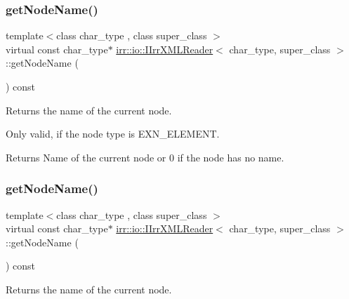 \subsubsection{\texorpdfstring{get\+Node\+Name()}{getNodeName()}\hspace{0.1cm}{\footnotesize\ttfamily [1/2]}}
{\footnotesize\ttfamily template$<$class char\+\_\+type , class super\+\_\+class $>$ \\
virtual const char\+\_\+type$\ast$ \hyperlink{classirr_1_1io_1_1IIrrXMLReader}{irr\+::io\+::\+I\+Irr\+X\+M\+L\+Reader}$<$ char\+\_\+type, super\+\_\+class $>$\+::get\+Node\+Name (\begin{DoxyParamCaption}{ }\end{DoxyParamCaption}) const\hspace{0.3cm}{\ttfamily [pure virtual]}}



Returns the name of the current node. 

Only valid, if the node type is E\+X\+N\+\_\+\+E\+L\+E\+M\+E\+NT. \begin{DoxyReturn}{Returns}
Name of the current node or 0 if the node has no name. 
\end{DoxyReturn}
\mbox{\label{classirr_1_1io_1_1IIrrXMLReader_a7d745b130c895d0f910f191d04e20e87}} 
\subsubsection{\texorpdfstring{get\+Node\+Name()}{getNodeName()}\hspace{0.1cm}{\footnotesize\ttfamily [2/2]}}
{\footnotesize\ttfamily template$<$class char\+\_\+type , class super\+\_\+class $>$ \\
virtual const char\+\_\+type$\ast$ \hyperlink{classirr_1_1io_1_1IIrrXMLReader}{irr\+::io\+::\+I\+Irr\+X\+M\+L\+Reader}$<$ char\+\_\+type, super\+\_\+class $>$\+::get\+Node\+Name (\begin{DoxyParamCaption}{ }\end{DoxyParamCaption}) const\hspace{0.3cm}{\ttfamily [pure virtual]}}



Returns the name of the current node. 

